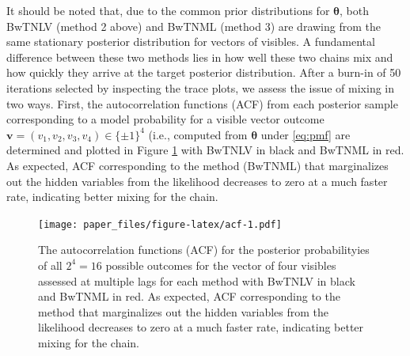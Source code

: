 \documentclass[AMS,STIX1COL]{WileyNJD-v2}
\begin{document}
\par

It should be noted that, due to the common prior distributions for
\(\boldsymbol \theta\), both BwTNLV (method 2 above) and BwTNML (method
3) are drawing from the same stationary posterior distribution for
vectors of visibles. A fundamental difference between these two methods
lies in how well these two chains mix and how quickly they arrive at the
target posterior distribution. After a burn-in of 50 iterations selected
by inspecting the trace plots, we assess the issue of mixing in two
ways. First, the autocorrelation functions (ACF) from each posterior
sample corresponding to a model probability for a visible vector outcome
\(\mathbf{v}=(v_1,v_2,v_3,v_4)\in\{\pm 1\}^4\) (i.e., computed from
\(\boldsymbol \theta\) under \eqref{eq:pmf} are determined and plotted
in Figure \ref{fig:acf} with BwTNLV in black and BwTNML in red. As
expected, ACF corresponding to the method (BwTNML) that marginalizes out
the hidden variables from the likelihood decreases to zero at a much
faster rate, indicating better mixing for the chain.

\par

\begin{figure}
\centering
\texttt{[image: paper\_files/figure-latex/acf-1.pdf]}
\caption{\label{fig:acf}The autocorrelation functions (ACF) for the
posterior probabilityies of all \(2^4 = 16\) possible outcomes for the
vector of four visibles assessed at multiple lags for each method with
BwTNLV in black and BwTNML in red. As expected, ACF corresponding to the
method that marginalizes out the hidden variables from the likelihood
decreases to zero at a much faster rate, indicating better mixing for
the chain.}
\end{figure}
\end{document}
